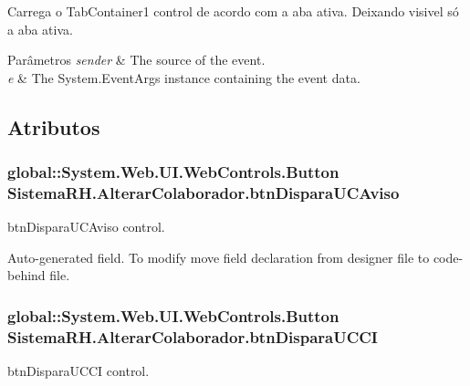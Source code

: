 Carrega o TabContainer1 control de acordo com a aba ativa. Deixando visivel só a aba ativa. 


\begin{DoxyParams}{Parâmetros}
{\em sender} & The source of the event.\\
\hline
{\em e} & The System.EventArgs instance containing the event data.\\
\hline
\end{DoxyParams}


\subsection{Atributos}
\hypertarget{class_sistema_r_h_1_1_alterar_colaborador_a5bbdb9da5cd6e85eead5d5de37d6170b}{
\subsubsection[{btnDisparaUCAviso}]{\setlength{\rightskip}{0pt plus 5cm}global::System.Web.UI.WebControls.Button {\bf SistemaRH.AlterarColaborador.btnDisparaUCAviso}}}
\label{class_sistema_r_h_1_1_alterar_colaborador_a5bbdb9da5cd6e85eead5d5de37d6170b}


btnDisparaUCAviso control. 

Auto-\/generated field. To modify move field declaration from designer file to code-\/behind file. \hypertarget{class_sistema_r_h_1_1_alterar_colaborador_a34c9bfddf4a54fafefb366b475c586b5}{
\subsubsection[{btnDisparaUCCI}]{\setlength{\rightskip}{0pt plus 5cm}global::System.Web.UI.WebControls.Button {\bf SistemaRH.AlterarColaborador.btnDisparaUCCI}}}
\label{class_sistema_r_h_1_1_alterar_colaborador_a34c9bfddf4a54fafefb366b475c586b5}


btnDisparaUCCI control. 

